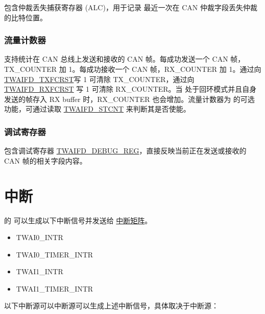\documentclass[main\_\_CN.tex]{subfiles}
\begin{document}
\modulename{} 包含仲裁丢失捕获寄存器 (ALC)，用于记录 \modulename{} 最近一次在 CAN 仲裁字段丢失仲裁的比特位置。

\subsubsection{流量计数器}

\modulename{} 支持统计在 CAN 总线上发送和接收的 CAN 帧。每成功发送一个 CAN 帧，TX\_COUNTER 加 1。每成功接收一个 CAN 帧，RX\_COUNTER 加 1。通过向 \hyperref[fielddesc:TWAIFDTXFCRST]{TWAIFD\_TXFCRST}写 1 可清除 TX\_COUNTER，通过向 \hyperref[fielddesc:TWAIFDRXFCRST]{TWAIFD\_RXFCRST} 写 1 可清除 RX\_COUNTER。当\modulename{} 处于回环模式并且自身发送的帧存入 RX buffer 时，RX\_COUNTER 也会增加。流量计数器为 \modulename{} 的可选功能，可通过读取 \hyperref[fielddesc:TWAIFDSTCNT]{TWAIFD\_STCNT} 来判断其是否使能。

\subsubsection{调试寄存器}

\modulename{} 包含调试寄存器 \hyperref[regdesc:TWAIFDDEBUGREG]{TWAIFD\_DEBUG\_REG}，直接反映当前正在发送或接收的 CAN 帧的相关字段内容。



\section{中断}\label{sec:twai-interrupt}

\chipname{} 的 \modulename{} 可以生成以下中断信号并发送给 \hyperref[mod:intmtrx]{中断矩阵}。

    \begin{itemize}
        \item TWAI0\_INTR
        \item TWAI0\_TIMER\_INTR
        \item TWAI1\_INTR
        \item TWAI1\_TIMER\_INTR
    \end{itemize}

以下中断源可以中断源可以生成上述中断信号，具体取决于中断源：
\end{document}

